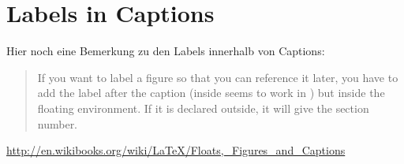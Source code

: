 \documentclass[10pt, a4paper]{article}
\begin{document}
\section{Labels in Captions}

Hier noch eine Bemerkung zu den Labels innerhalb von Captions:
\begin{quote}
If you want to label a figure so that you can reference it later, you have to add the label after the caption (inside seems to work in \LaTeXe) but inside the floating environment. If it is declared outside, it will give the section number.\end{quote}

\noindent\url{http://en.wikibooks.org/wiki/LaTeX/Floats,_Figures_and_Captions}
\end{document}

